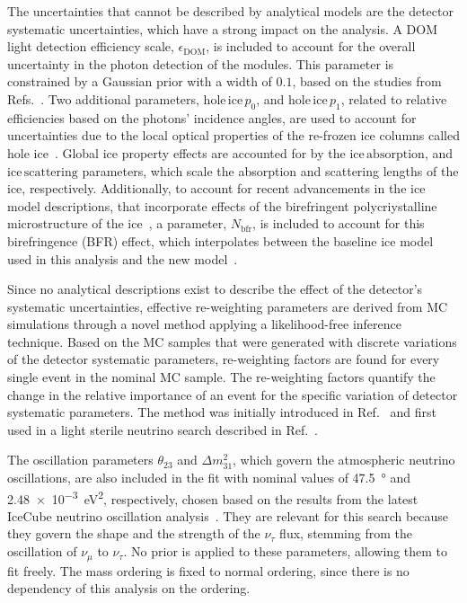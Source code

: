 \documentclass[
    aps,
    prd,
    reprint,
    amsmath,
    amssymb,
    nofootinbib,
    superscriptaddress,
    floatfix
]{revtex4-2}
\renewcommand{\rm}{\mathrm}
\newcommand{\rm}{\mathrm}
\begin{document}
The uncertainties that cannot be described by analytical models are the detector systematic uncertainties, which have a strong impact on the analysis.
A DOM light detection efficiency scale, $\epsilon_{\rm{DOM}}$, is included to account for the overall uncertainty in the photon detection of the modules.
This parameter is constrained by a Gaussian prior with a width of $0.1$, based on the studies from Refs.~\cite{JFeintzeig_phd, domeff_nick}.
Two additional parameters, $\rm{hole \, ice} \, p_0$, and $\rm{hole \, ice} \, p_1$, related to relative efficiencies based on the photons' incidence angles, are used to account for uncertainties due to the local optical properties of the re-frozen ice columns called hole ice~\cite{Eller:2023ko}.
Global ice property effects are accounted for by the $\rm{ice \, absorption}$, and $\rm{ice \, scattering}$ parameters, which scale the absorption and scattering lengths of the ice, respectively.
Additionally, to account for recent advancements in the ice model descriptions, that incorporate effects of the birefringent polycriystalline microstructure of the ice~\cite{bfr_ice_tc-18-75-2024}, a parameter, $N_\rm{bfr}$, is included to account for this birefringence (BFR) effect, which interpolates between the baseline ice model used in this analysis and the new model~\cite{IceCube:2024xjj}.

Since no analytical descriptions exist to describe the effect of the detector's systematic uncertainties, effective re-weighting parameters are derived from MC simulations through a novel method applying a likelihood-free inference technique.
Based on the MC samples that were generated with discrete variations of the detector systematic parameters, re-weighting factors are found for every single event in the nominal MC sample.
The re-weighting factors quantify the change in the relative importance of an event for the specific variation of detector systematic parameters. The method was initially introduced in Ref.~\cite{Fischer_2023} and first used in a light sterile neutrino search described in Ref.~\cite{Abbasi:2024ktc}.

The oscillation parameters $\theta_{23}$ and $\Delta m^{2}_{31}$, which govern the atmospheric neutrino oscillations, are also included in the fit with nominal values of \SI{47.5}{\degree} and \SI{2.48e-3}{\electronvolt^2}, respectively, chosen based on the results from the latest IceCube neutrino oscillation analysis~\cite{IceCube:2024xjj}.
They are relevant for this search because they govern the shape and the strength of the $\nu_\tau$ flux, stemming from the oscillation of $\nu_\mu$ to $\nu_\tau$.
No prior is applied to these parameters, allowing them to fit freely.
The mass ordering is fixed to normal ordering, since there is no dependency of this analysis on the ordering.
\end{document}
